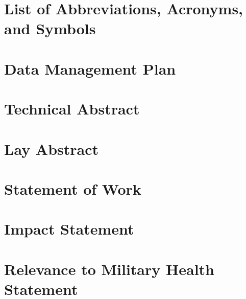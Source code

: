 \documentclass[onecolumn, compsoc,12pt]{IEEEtran}
\begin{document}
\clearpage

\section*{List of Abbreviations, Acronyms, and Symbols}

\clearpage


\section*{Data Management Plan}

\clearpage
{}

\section*{Technical Abstract}

\clearpage

\section*{Lay Abstract}



\clearpage
{}

\section*{Statement of Work}



\clearpage
{}
\section*{Impact Statement}
\clearpage

\section*{Relevance to Military Health Statement}
\end{document}
